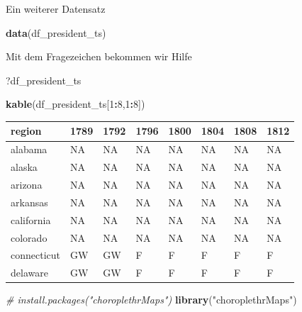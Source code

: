 \documentclass[ignorenonframetext,]{beamer}
\newenvironment{Shaded}{\begin{snugshade}}{\end{snugshade}}
\newcommand{\KeywordTok}[1]{\textcolor[rgb]{0.13,0.29,0.53}{\textbf{#1}}}
\newcommand{\DecValTok}[1]{\textcolor[rgb]{0.00,0.00,0.81}{#1}}
\newcommand{\StringTok}[1]{\textcolor[rgb]{0.31,0.60,0.02}{#1}}
\newcommand{\CommentTok}[1]{\textcolor[rgb]{0.56,0.35,0.01}{\textit{#1}}}
\newcommand{\OperatorTok}[1]{\textcolor[rgb]{0.81,0.36,0.00}{\textbf{#1}}}
\newcommand{\NormalTok}[1]{#1}
\begin{document}
\begin{frame}[fragile]{Ein weiterer Datensatz}

\begin{Shaded}
\begin{Highlighting}[]
\KeywordTok{data}\NormalTok{(df_president_ts)}
\end{Highlighting}
\end{Shaded}

Mit dem Fragezeichen bekommen wir Hilfe

\begin{Shaded}
\begin{Highlighting}[]
\NormalTok{?df_president_ts}
\end{Highlighting}
\end{Shaded}

\begin{Shaded}
\begin{Highlighting}[]
\KeywordTok{kable}\NormalTok{(df_president_ts[}\DecValTok{1}\OperatorTok{:}\DecValTok{8}\NormalTok{,}\DecValTok{1}\OperatorTok{:}\DecValTok{8}\NormalTok{])}
\end{Highlighting}
\end{Shaded}

\begin{longtable}[]{@{}llllllll@{}}
\toprule
region & 1789 & 1792 & 1796 & 1800 & 1804 & 1808 & 1812\tabularnewline
\midrule
\endhead
alabama & NA & NA & NA & NA & NA & NA & NA\tabularnewline
alaska & NA & NA & NA & NA & NA & NA & NA\tabularnewline
arizona & NA & NA & NA & NA & NA & NA & NA\tabularnewline
arkansas & NA & NA & NA & NA & NA & NA & NA\tabularnewline
california & NA & NA & NA & NA & NA & NA & NA\tabularnewline
colorado & NA & NA & NA & NA & NA & NA & NA\tabularnewline
connecticut & GW & GW & F & F & F & F & F\tabularnewline
delaware & GW & GW & F & F & F & F & F\tabularnewline
\bottomrule
\end{longtable}

\begin{Shaded}
\begin{Highlighting}[]
\CommentTok{# install.packages("choroplethrMaps")}
\KeywordTok{library}\NormalTok{(}\StringTok{"choroplethrMaps"}\NormalTok{)}
\end{Highlighting}
\end{Shaded}

\end{frame}
\end{document}
